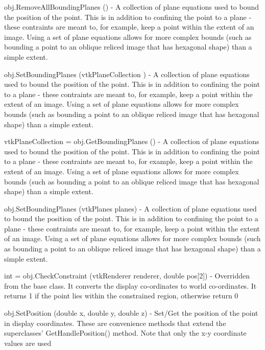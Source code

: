 \begin{DoxyItemize}
\item {\ttfamily obj.\-Remove\-All\-Bounding\-Planes ()} -\/ A collection of plane equations used to bound the position of the point. This is in addition to confining the point to a plane -\/ these contraints are meant to, for example, keep a point within the extent of an image. Using a set of plane equations allows for more complex bounds (such as bounding a point to an oblique reliced image that has hexagonal shape) than a simple extent.  
\item {\ttfamily obj.\-Set\-Bounding\-Planes (vtk\-Plane\-Collection )} -\/ A collection of plane equations used to bound the position of the point. This is in addition to confining the point to a plane -\/ these contraints are meant to, for example, keep a point within the extent of an image. Using a set of plane equations allows for more complex bounds (such as bounding a point to an oblique reliced image that has hexagonal shape) than a simple extent.  
\item {\ttfamily vtk\-Plane\-Collection = obj.\-Get\-Bounding\-Planes ()} -\/ A collection of plane equations used to bound the position of the point. This is in addition to confining the point to a plane -\/ these contraints are meant to, for example, keep a point within the extent of an image. Using a set of plane equations allows for more complex bounds (such as bounding a point to an oblique reliced image that has hexagonal shape) than a simple extent.  
\item {\ttfamily obj.\-Set\-Bounding\-Planes (vtk\-Planes planes)} -\/ A collection of plane equations used to bound the position of the point. This is in addition to confining the point to a plane -\/ these contraints are meant to, for example, keep a point within the extent of an image. Using a set of plane equations allows for more complex bounds (such as bounding a point to an oblique reliced image that has hexagonal shape) than a simple extent.  
\item {\ttfamily int = obj.\-Check\-Constraint (vtk\-Renderer renderer, double pos\mbox{[}2\mbox{]})} -\/ Overridden from the base class. It converts the display co-\/ordinates to world co-\/ordinates. It returns 1 if the point lies within the constrained region, otherwise return 0  
\item {\ttfamily obj.\-Set\-Position (double x, double y, double z)} -\/ Set/\-Get the position of the point in display coordinates. These are convenience methods that extend the superclasses' Get\-Handle\-Position() method. Note that only the x-\/y coordinate values are used  

\end{DoxyItemize}
